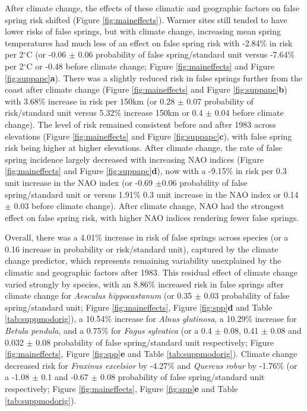 \documentclass{article}\usepackage[]{graphicx}\usepackage[]{color}
\begin{document}
After climate change, the effects of these climatic and geographic factors on false spring risk shifted (Figure \ref{fig:maineffects}). Warmer sites still tended to have lower risks of false springs, but with climate change, increasing mean spring temperatures had much less of an effect on false spring risk with -2.84\% in risk per 2$^{\circ}$C (or -0.06 $\pm$ 0.06 probability of false spring/standard unit versus -7.64\% per 2$^{\circ}$C or -0.48 before climate change; Figure \ref{fig:maineffects} and Figure \ref{fig:suppapc}\textbf{a}). There was a slightly reduced risk in false springs further from the coast after climate change (Figure \ref{fig:maineffects} and Figure \ref{fig:suppapc}\textbf{b}) with 3.68\% increase in risk per 150km (or 0.28 $\pm$ 0.07 probability of risk/standard unit versus 5.32\% increase 150km or 0.4 $\pm$ 0.04 before climate change). The level of risk remained consistent before and after 1983 across elevations (Figure \ref{fig:maineffects} and Figure \ref{fig:suppapc}\textbf{c}), with false spring risk being higher at higher elevations. After climate change, the rate of false spring incidence largely decreased with increasing NAO indices (Figure \ref{fig:maineffects} and Figure \ref{fig:suppapc}\textbf{d}), now with a -9.15\% in risk per 0.3 unit increase in the NAO index (or -0.69 $\pm$0.06 probability of false spring/standard unit or versus 1.91\% 0.3 unit increase in the NAO index or 0.14 $\pm$ 0.03 before climate change). After climate change, NAO had the strongest effect on false spring risk, with higher NAO indices rendering fewer false springs.

Overall, there was a 4.01\% increase in risk of false springs across species (or a 0.16 increase in probability or risk/standard unit), captured by the climate change predictor, which represents remaining variability unexplained by the climatic and geographic factors after 1983. This residual effect of climate change varied strongly by species, with an 8.86\% increased risk in false springs after climate change for \textit{Aesculus hippocastanum} (or 0.35 $\pm$ 0.03 probability of false spring/standard unit; Figure \ref{fig:maineffects}, Figure \ref{fig:spp}\textbf{d} and Table \ref{tab:suppmodorig}), a 10.54\% increase for \textit{Alnus glutinosa}, a 10.29\% increase for \textit{Betula pendula}, and a 0.75\% for \textit{Fagus sylvatica} (or a 0.4 $\pm$ 0.08, 0.41 $\pm$ 0.08 and 0.032 $\pm$ 0.08 probability of false spring/standard unit respectively; Figure \ref{fig:maineffects}, Figure \ref{fig:spp}\textbf{e} and Table \ref{tab:suppmodorig}). Climate change decreased risk for \textit{Fraxinus excelsior} by -4.27\% and \textit{Quercus robur} by -1.76\% (or a -1.08 $\pm$ 0.1 and -0.67 $\pm$ 0.08 probability of false spring/standard unit respectively; Figure \ref{fig:maineffects}, Figure \ref{fig:spp}\textbf{e} and Table \ref{tab:suppmodorig}). %
\end{document}
